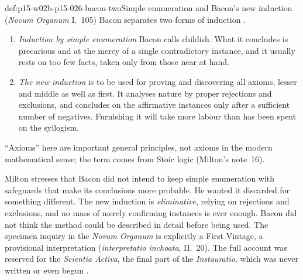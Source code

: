 \begin{hbdefinition}{def:p15-w02b-p15-026-bacon-two}{Simple enumeration and Bacon's new induction (\emph{Novum Organum} I.~105)}
Bacon separates two forms of induction \cite[pp.~25--26]{Milton2011InductionBeforeHume}.
\begin{enumerate}
\item \emph{Induction by simple enumeration} Bacon calls childish. What it
  concludes is precarious and at the mercy of a single contradictory
  instance, and it usually rests on too few facts, taken only from those
  near at hand.
\item \emph{The new induction} is to be used for proving and discovering all
  axioms, lesser and middle as well as first. It analyses nature by proper
  rejections and exclusions, and concludes on the affirmative instances
  only after a sufficient number of negatives. Furnishing it will take more
  labour than has been spent on the syllogism.
\end{enumerate}
``Axioms'' here are important general principles, not axioms in the modern
mathematical sense; the term comes from Stoic logic (Milton's note~16).
\end{hbdefinition}

Milton stresses that Bacon did not intend to keep simple enumeration with
safeguards that make its conclusions more probable. He wanted it discarded
for something different. The new induction is \emph{eliminative}, relying on
rejections and exclusions, and no mass of merely confirming instances is
ever enough. Bacon did not think the method could be described in detail
before being used. The specimen inquiry in the \emph{Novum Organum} is
explicitly a First Vintage, a provisional interpretation
(\emph{interpretatio inchoata}, II.~20). The full account was reserved for
the \emph{Scientia Activa}, the final part of the \emph{Instauratio}, which
was never written or even begun \cite[p.~26]{Milton2011InductionBeforeHume}.

